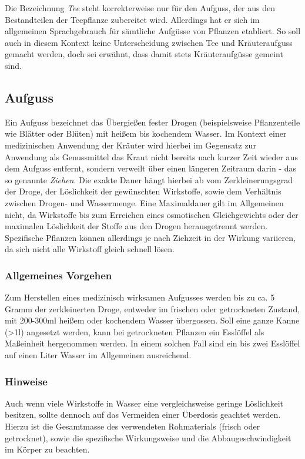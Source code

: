Die Bezeichnung \textit{Tee} steht korrekterweise nur für den Aufguss, der aus den Bestandteilen der Teepflanze zubereitet wird. Allerdings hat er sich im allgemeinen Sprachgebrauch für sämtliche Aufgüsse von Pflanzen etabliert. So soll auch in diesem Kontext keine Unterscheidung zwischen Tee und Kräuteraufguss gemacht werden, doch sei erwähnt, dass damit stets Kräuteraufgüsse gemeint sind.

\subsection{Aufguss}

Ein Aufguss bezeichnet das Übergießen fester Drogen (beispielsweise Pflanzenteile wie Blätter oder Blüten) mit heißem bis kochendem Wasser. Im Kontext einer medizinischen Anwendung der Kräuter wird hierbei im Gegensatz zur Anwendung als Genussmittel das Kraut nicht bereits nach kurzer Zeit wieder aus dem Aufguss entfernt, sondern verweilt über einen längeren Zeitraum darin - das so genannte \textit{Ziehen}. Die exakte Dauer hängt hierbei ab vom Zerkleinerungsgrad der Droge, der Löslichkeit der gewünschten Wirkstoffe, sowie dem Verhältnis zwischen Drogen- und Wassermenge. Eine Maximaldauer gilt im Allgemeinen nicht, da Wirkstoffe bis zum Erreichen eines osmotischen Gleichgewichts oder der maximalen Löslichkeit der Stoffe aus den Drogen herausgetrennt werden. Spezifische Pflanzen können allerdings je nach Ziehzeit in der Wirkung variieren, da sich nicht alle Wirkstoff gleich schnell lösen.

\subsubsection{Allgemeines Vorgehen}

Zum Herstellen eines medizinisch wirksamen Aufgusses werden bis zu ca. 5 Gramm der zerkleinerten Droge, entweder im frischen oder getrockneten Zustand, mit 200-300ml heißem oder kochendem Wasser übergossen. Soll eine ganze Kanne (>1l) angesetzt werden, kann bei getrockneten Pflanzen ein Esslöffel als Maßeinheit hergenommen werden. In einem solchen Fall sind ein bis zwei Esslöffel auf einen Liter Wasser im Allgemeinen ausreichend.

\subsubsection{Hinweise}

Auch wenn viele Wirkstoffe in Wasser eine vergleichsweise geringe Löslichkeit besitzen, sollte dennoch auf das Vermeiden einer Überdosis geachtet werden. Hierzu ist die Gesamtmasse des verwendeten Rohmaterials (frisch oder getrocknet), sowie die spezifische Wirkungsweise und die Abbaugeschwindigkeit im Körper zu beachten.

